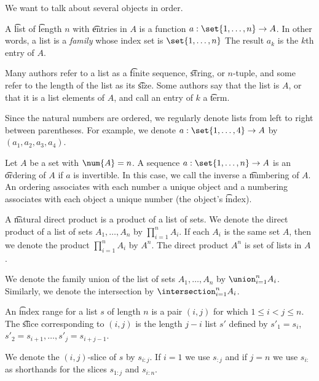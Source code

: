 
We want to talk about several objects in order.


A \t{list} of \t{length} $n$ with \t{entries} in $A$ is a function $a: \set{1, \dots, n} \to A$.
In other words, a list is a \textit{family} whose index set is $\set{1, \dots, n}$
The result $a_k$ is the \t{$k$th entry} of $A$.

Many authors refer to a list as a \t{finite sequence}, \t{string}, or \t{$n$-tuple}, and some refer to the length of the list as its \t{size}.
Some authors say that the list is  $A$, or that it is a list  elements of $A$, and call an entry of $k$ a \t{term}.


Since the natural numbers are ordered, we regularly denote lists from left to right between parentheses.
For example, we denote $a: \set{1, \dots, 4} \to A$ by $(a_1, a_2, a_3, a_4)$.

Let $A$ be a set with $\num{A} = n$.
A sequence $a: \set{1, \dots, n} \to A$ is an \t{ordering} of $A$ if $a$ is invertible.
In this case, we call the inverse a \t{numbering} of $A$.
An ordering associates with each number a unique object and a numbering associates with each object a unique number (the object's \t{index}).


A \t{natural direct product} is a product of a list of sets.
We denote the direct product of a list of sets $A_1, \dots, A_n$ by $\prod_{i = 1}^{n} A_i$.
If each $A_i$ is the same set $A$, then we denote the product $\prod_{i = 1}^{n} A_i$ by $A^n$.
The direct product $A^n$ is set of lists in $A$ .

We denote the family union of the list of sets $A_1, \dots, A_n$ by $\union_{i = 1}^{n} A_i$.
Similarly, we denote the intersection by $\intersection_{i = 1}^{n} A_i$.

An \t{index range} for a list $s$ of length $n$ is a pair $(i, j)$ for which $1 \leq i < j \leq n$.
The \t{slice} corresponding to $(i,j)$ is the length $j-i$ list $s'$ defined by $s'_1 = s_{i}$, $s'_2 = s_{i+1}, \dots, s'_{j} = s_{i + j-1}$.

We denote the $(i,j)$-slice of $s$ by $s_{i:j}$.
If $i = 1$ we use $s_{:j}$ and if $j = n$ we use $s_{i:}$ as shorthands for the slices $s_{1:j}$ and $s_{i:n}$.
